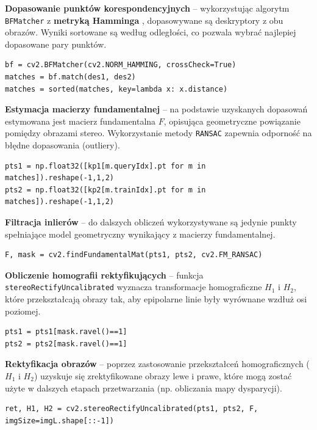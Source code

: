 \documentclass[magisterska]{pracadypl}
\begin{document}
\textbf{Dopasowanie punktów korespondencyjnych} – wykorzystując algorytm \texttt{BFMatcher} z \textbf{metryką Hamminga} \cite{hamming}, dopasowywane są deskryptory z obu obrazów. Wyniki sortowane są według odległości, co pozwala wybrać najlepiej dopasowane pary punktów.

\begin{lstlisting}[style=mypython]
bf = cv2.BFMatcher(cv2.NORM_HAMMING, crossCheck=True)
matches = bf.match(des1, des2)
matches = sorted(matches, key=lambda x: x.distance)
\end{lstlisting}

\textbf{Estymacja macierzy fundamentalnej} – na podstawie uzyskanych dopasowań estymowana jest macierz fundamentalna $F$, opisująca geometryczne powiązanie pomiędzy obrazami stereo. Wykorzystanie metody \texttt{RANSAC} zapewnia odporność na błędne dopasowania (outliery).

\begin{lstlisting}[style=mypython]
pts1 = np.float32([kp1[m.queryIdx].pt for m in matches]).reshape(-1,1,2)
pts2 = np.float32([kp2[m.trainIdx].pt for m in matches]).reshape(-1,1,2)
\end{lstlisting}

\textbf{Filtracja inlierów} – do dalszych obliczeń wykorzystywane są jedynie punkty spełniające model geometryczny wynikający z macierzy fundamentalnej.

\begin{lstlisting}[style=mypython]
F, mask = cv2.findFundamentalMat(pts1, pts2, cv2.FM_RANSAC)
\end{lstlisting}

\textbf{Obliczenie homografii rektyfikujących} – funkcja \texttt{stereoRectifyUncalibrated} wyznacza transformacje homograficzne $H_1$ i $H_2$, które przekształcają obrazy tak, aby epipolarne linie były wyrównane wzdłuż osi poziomej.

\begin{lstlisting}[style=mypython]
pts1 = pts1[mask.ravel()==1]
pts2 = pts2[mask.ravel()==1]
\end{lstlisting}

\textbf{Rektyfikacja obrazów} – poprzez zastosowanie przekształceń homograficznych ($H_1$ i $H_2$) uzyskuje się zrektyfikowane obrazy lewe i prawe, które mogą zostać użyte w dalszych etapach przetwarzania (np. obliczania mapy dysparycji).

\begin{lstlisting}[style=mypython]
ret, H1, H2 = cv2.stereoRectifyUncalibrated(pts1, pts2, F, imgSize=imgL.shape[::-1])
\end{lstlisting}
\end{document}
